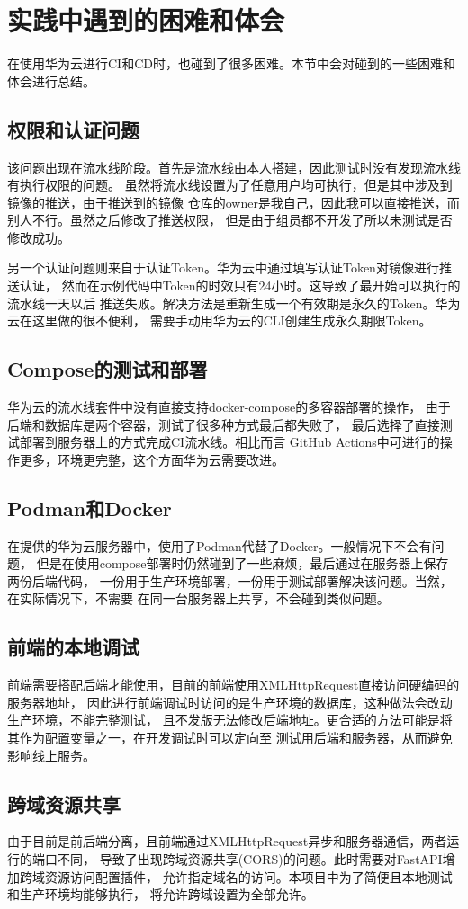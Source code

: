 \section{实践中遇到的困难和体会}

在使用华为云进行CI和CD时，也碰到了很多困难。本节中会对碰到的一些困难和体会进行总结。

\subsection{权限和认证问题}

该问题出现在流水线阶段。首先是流水线由本人搭建，因此测试时没有发现流水线有执行权限的问题。
虽然将流水线设置为了任意用户均可执行，但是其中涉及到镜像的推送，由于推送到的镜像
仓库的owner是我自己，因此我可以直接推送，而别人不行。虽然之后修改了推送权限，
但是由于组员都不开发了所以未测试是否修改成功。

另一个认证问题则来自于认证Token。华为云中通过填写认证Token对镜像进行推送认证，
然而在示例代码中Token的时效只有24小时。这导致了最开始可以执行的流水线一天以后
推送失败。解决方法是重新生成一个有效期是永久的Token。华为云在这里做的很不便利，
需要手动用华为云的CLI创建生成永久期限Token。

\subsection{Compose的测试和部署}

华为云的流水线套件中没有直接支持docker-compose的多容器部署的操作，
由于后端和数据库是两个容器，测试了很多种方式最后都失败了，
最后选择了直接测试部署到服务器上的方式完成CI流水线。相比而言
GitHub Actions中可进行的操作更多，环境更完整，这个方面华为云需要改进。

\subsection{Podman和Docker}

在提供的华为云服务器中，使用了Podman代替了Docker。一般情况下不会有问题，
但是在使用compose部署时仍然碰到了一些麻烦，最后通过在服务器上保存两份后端代码，
一份用于生产环境部署，一份用于测试部署解决该问题。当然，在实际情况下，不需要
在同一台服务器上共享，不会碰到类似问题。

\subsection{前端的本地调试}

前端需要搭配后端才能使用，目前的前端使用XMLHttpRequest直接访问硬编码的服务器地址，
因此进行前端调试时访问的是生产环境的数据库，这种做法会改动生产环境，不能完整测试，
且不发版无法修改后端地址。更合适的方法可能是将其作为配置变量之一，在开发调试时可以定向至
测试用后端和服务器，从而避免影响线上服务。

\subsection{跨域资源共享}

由于目前是前后端分离，且前端通过XMLHttpRequest异步和服务器通信，两者运行的端口不同，
导致了出现跨域资源共享(CORS)的问题。此时需要对FastAPI增加跨域资源访问配置插件，
允许指定域名的访问。本项目中为了简便且本地测试和生产环境均能够执行，
将允许跨域设置为全部允许。